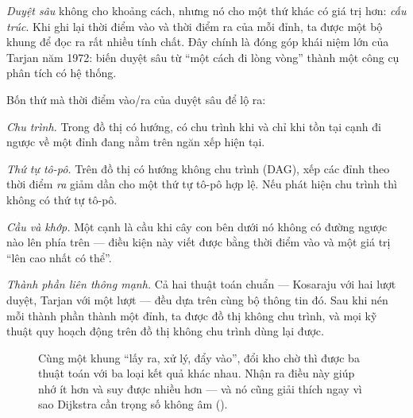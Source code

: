 \documentclass[../../algorithm.tex]{subfiles}
\begin{document}
\emph{Duyệt sâu} không cho khoảng cách, nhưng nó cho một thứ khác có giá trị hơn: \emph{cấu trúc}. Khi ghi lại thời điểm vào và thời điểm ra của mỗi đỉnh, ta được một bộ khung để đọc ra rất nhiều tính chất. Đây chính là đóng góp khái niệm lớn của Tarjan năm 1972\cite{tarjan1972}: biến duyệt sâu từ ``một cách đi lòng vòng'' thành một công cụ phân tích có hệ thống.

Bốn thứ mà thời điểm vào/ra của duyệt sâu để lộ ra:

\emph{Chu trình.} Trong đồ thị có hướng, có chu trình khi và chỉ khi tồn tại cạnh đi ngược về một đỉnh đang nằm trên ngăn xếp hiện tại.

\emph{Thứ tự tô-pô.} Trên đồ thị có hướng không chu trình (DAG), xếp các đỉnh theo thời điểm \emph{ra} giảm dần cho một thứ tự tô-pô hợp lệ. Nếu phát hiện chu trình thì không có thứ tự tô-pô.

\emph{Cầu và khớp.} Một cạnh là cầu khi cây con bên dưới nó không có đường ngược nào lên phía trên --- điều kiện này viết được bằng thời điểm vào và một giá trị ``lên cao nhất có thể''.

\emph{Thành phần liên thông mạnh.} Cả hai thuật toán chuẩn --- Kosaraju với hai lượt duyệt, Tarjan với một lượt --- đều dựa trên cùng bộ thông tin đó. Sau khi nén mỗi thành phần thành một đỉnh, ta được đồ thị không chu trình, và mọi kỹ thuật quy hoạch động trên đồ thị không chu trình dùng lại được.

\begin{figure}[H]\centering
{}
\caption{Cùng một khung ``lấy ra, xử lý, đẩy vào'', đổi kho chờ thì được ba thuật toán với ba loại kết quả khác nhau. Nhận ra điều này giúp nhớ ít hơn và suy được nhiều hơn --- và nó cũng giải thích ngay vì sao Dijkstra cần trọng số không âm ().}
\label{fig:traversal}
\end{figure}
\end{document}
